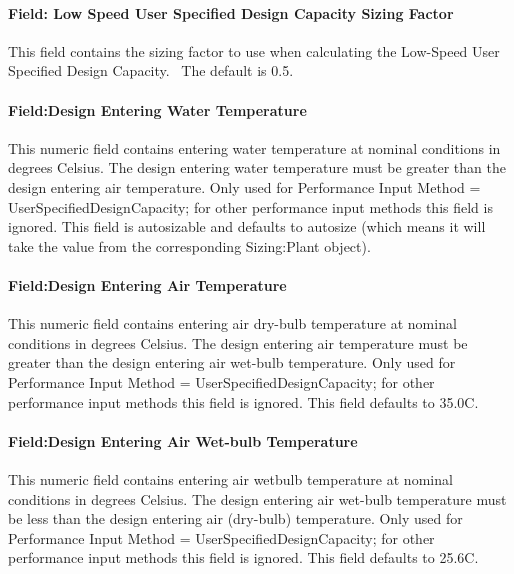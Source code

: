 \paragraph{Field: Low Speed User Specified Design Capacity Sizing Factor}\label{field-low-speed-user-specified-design-capacity-sizing-factor}

This field contains the sizing factor to use when calculating the Low-Speed User Specified Design Capacity.~ The default is 0.5.

\paragraph{Field:Design Entering Water Temperature}\label{fielddesign-entering-water-temperature-1}

This numeric field contains entering water temperature at nominal conditions in degrees Celsius. The design entering water temperature must be greater than the design entering air temperature. Only used for Performance Input Method = UserSpecifiedDesignCapacity; for other performance input methods this field is ignored. This field is autosizable and defaults to autosize (which means it will take the value from the corresponding Sizing:Plant object).

\paragraph{Field:Design Entering Air Temperature}\label{fielddesign-entering-air-temperature-1}

This numeric field contains entering air dry-bulb temperature at nominal conditions in degrees Celsius. The design entering air temperature must be greater than the design entering air wet-bulb temperature. Only used for Performance Input Method = UserSpecifiedDesignCapacity; for other performance input methods this field is ignored. This field defaults to 35.0C.

\paragraph{Field:Design Entering Air Wet-bulb Temperature}\label{fielddesign-entering-air-wet-bulb-temperature-1}

This numeric field contains entering air wetbulb temperature at nominal conditions in degrees Celsius. The design entering air wet-bulb temperature must be less than the design entering air (dry-bulb) temperature. Only used for Performance Input Method = UserSpecifiedDesignCapacity; for other performance input methods this field is ignored. This field defaults to 25.6C.

